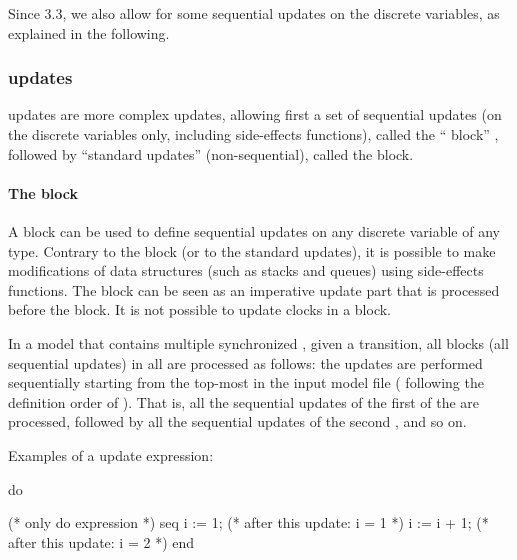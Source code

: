 Since \imitator{} 3.3, we also allow for some sequential updates on the discrete variables, as explained in the following.

\subsubsection{ updates}\label{section:seq_then_form_updates}

 updates are more complex updates, allowing first a set of sequential updates (on the discrete variables only, including side-effects functions), called the `` block'' , followed by ``standard updates'' (non-sequential), called the  block.

\paragraph{The  block}

A  block can be used to define sequential updates on any discrete variable of any type.
Contrary to the  block (or to the standard updates), it is possible to make modifications of data structures (such as stacks and queues) using side-effects functions.
The  block can be seen as an imperative update part that is processed before the  block.
It is not possible to update clocks in a  block.

In a model that contains multiple synchronized \IPTA{}, given a transition, all  blocks (all sequential updates) in all \IPTA{} are processed as follows:
the updates are performed sequentially starting from the top-most \IPTA{} in the input model file (\ie{} following the definition order of \IPTA{}).
That is, all the sequential updates of the first of the \IPTA{} are processed, followed by all  the sequential updates of the second \IPTA{}, and so on.


Examples of a  update expression:

\begin{IMITATORmodel}
	do {

		(* only do expression *)
		seq
			i := 1; (* after this update: i = 1 *)
			i := i + 1; (* after this update: i = 2 *)
		end

	}
\end{IMITATORmodel}

